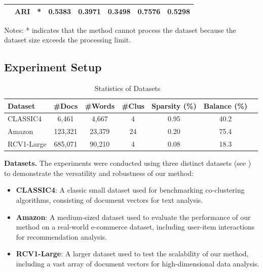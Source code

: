 \documentclass[journal]{IEEEtran}
\renewcommand{\cite}[1]{~\autocite{#1}}
\begin{document}
\begin{table}[htbp]
\begin{tabular}{@{} l c cccccc @{}}
                                    & ARI                     & *                                                & 0.5383                                         & 0.3971                                           & 0.3498                                    & \textbf{0.7576}        & 0.5298                   \\
        \bottomrule
    \end{tabular}
    \begin{tablenotes}
        \small
        \item Notes: * indicates that the method cannot process the dataset because the dataset size exceeds the processing limit.
    \end{tablenotes}
\end{table}


\subsection{Experiment Setup}

\begin{table}[h]
    \centering
    \caption{Statistics of Datasets~\cite{role2019CoClustPythonPackage}}
    \label{tab:dataset-statistics}
    \begin{tabular}{lccc@{}c@{}c@{}c}
        \hline
        \textbf{Dataset} & \textbf{\#Docs} & \textbf{\#Words} & \textbf{\#Clus} & \textbf{Sparsity (\%)} & \textbf{Balance (\%)} \\
        \hline
        CLASSIC4         & 6,461           & 4,667            & 4               & 0.95                   & 40.2                  \\
        Amazon           & 123,321         & 23,379           & 24              & 0.20                   & 75.4                  \\
        RCV1-Large       & 685,071         & 90,210           & 4               & 0.08                   & 18.3                  \\
        \hline
    \end{tabular}
\end{table}

\textbf{Datasets.}
The experiments were conducted using three distinct datasets (see ) to demonstrate the versatility and robustness of our method:
\begin{itemize}
    \item \textbf{CLASSIC4}: A classic small dataset used for benchmarking co-clustering algorithms, consisting of document vectors for text analysis.
    \item \textbf{Amazon}: A medium-sized dataset used to evaluate the performance of our method on a real-world e-commerce dataset, including user-item interactions for recommendation analysis.
    \item \textbf{RCV1-Large}: A larger dataset used to test the scalability of our method, including a vast array of document vectors for high-dimensional data analysis.
\end{itemize}
\end{document}
